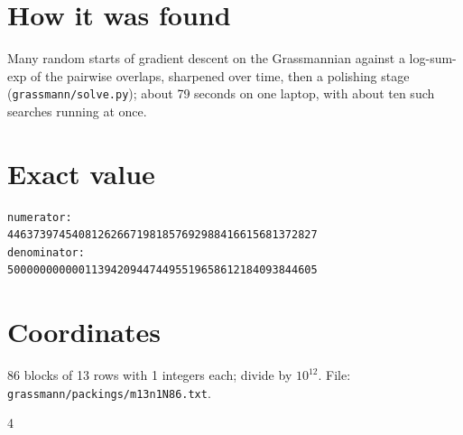 \documentclass[11pt,a4paper]{article}
\begin{document}
\section{How it was found}
Many random starts of gradient descent on the Grassmannian against a log-sum-exp of the pairwise overlaps, sharpened over time, then a polishing stage (\texttt{grassmann/solve.py}); about 79 seconds on one laptop, with about ten such searches running at once.


\appendix
\section{Exact value}
{\small
\begin{verbatim}
numerator:
446373974540812626671981857692988416615681372827
denominator:
500000000000113942094474495519658612184093844605
\end{verbatim}}

\section{Coordinates}
86 blocks of 13 rows with 1 integers each; divide by $10^{12}$. File: \texttt{grassmann/packings/m13n1N86.txt}.
{\tiny
\begin{multicols}{4}
\end{multicols}}
\end{document}
